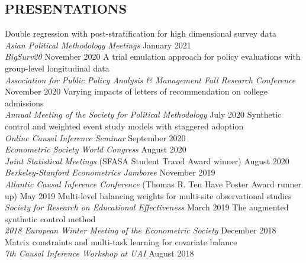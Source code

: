 \documentclass{res}
\begin{document}
\begin{resume}
\section{PRESENTATIONS}
\medskip
\hspace{0.2em} Double regression with post-stratification for high dimensional survey data\\
\emph{Asian Political Methodology Meetings} \hfill January 2021\\
\emph{BigSurv20} \hfill November 2020
\vskip -8pt
\hspace{0.2em} A trial emulation approach for policy evaluations with group-level longitudinal data\\
\emph{Association for Public Policy Analysis \& Management Fall Research Conference} \hfill November 2020
\vskip -8pt
\hspace{0.2em} Varying impacts of letters of recommendation on college admissions\\
\emph{Annual Meeting of the Society for Political Methodology} \hfill July 2020
\vskip -8pt
\hspace{0.2em} Synthetic control and weighted event study models with staggered adoption\\
\emph{Online Causal Inference Seminar} \hfill September 2020\\
\emph{Econometric Society World Congress} \hfill August 2020\\
\emph{Joint Statistical Meetings} {\footnotesize (SFASA Student Travel Award winner)} \hfill August 2020 \\
\emph{Berkeley-Stanford Econometrics Jamboree} \hfill November 2019\\
\emph{Atlantic Causal Inference Conference} {\footnotesize (Thomas R. Ten Have Poster Award runner up)} \hfill May 2019
\vskip -8pt
\hspace{0.2em} Multi-level balancing weights for multi-site observational studies\\
\emph{Society for Research on Educational Effectiveness} \hfill March 2019
\vskip -8pt
\hspace{0.2em} The augmented synthetic control method\\ \emph{2018 European Winter Meeting of the Econometric Society} \hfill December 2018
\vskip -8pt
\hspace{0.2em} Matrix constraints and multi-task learning for covariate balance \\ \emph{7th Causal Inference Workshop at UAI} \hfill August 2018


\end{resume}
\end{document}
